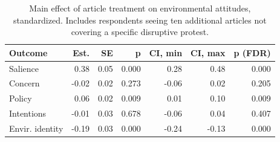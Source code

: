 \begin{table}[h!t]
\centering
\begin{tabular}{lrrrrrr}
  \hline
Outcome & Est. & SE & p & CI, min & CI, max & p (FDR) \\ 
  \hline
Salience & 0.38 & 0.05 & 0.000 & 0.28 & 0.48 & 0.000 \\ 
  Concern & -0.02 & 0.02 & 0.273 & -0.06 & 0.02 & 0.205 \\ 
  Policy & 0.06 & 0.02 & 0.009 & 0.01 & 0.10 & 0.009 \\ 
  Intentions & -0.01 & 0.03 & 0.678 & -0.06 & 0.04 & 0.407 \\ 
  Envir. identity & -0.19 & 0.03 & 0.000 & -0.24 & -0.13 & 0.000 \\ 
   \hline
\end{tabular}
\caption{Main effect of article treatment on environmental attitudes, standardized.
                   Includes respondents seeing ten additional articles not covering a specific
                   disruptive protest.} 
\label{tab:main_nonspec}
\end{table}
